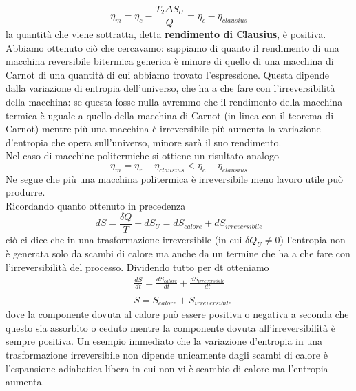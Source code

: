 \documentclass[
10pt, %
a4paper, %
oneside, %
headinclude,footinclude, %
BCOR5mm, %
]{scrartcl}
\begin{document}
\[ \eta_m = \eta_c-\frac{T_2\Delta S_U}{Q} = \eta_c - \eta_{clausius} \]
la quantità che viene sottratta, detta \textbf{rendimento di Clausius}, è positiva. Abbiamo ottenuto ciò che cercavamo: sappiamo di quanto il rendimento di una macchina reversibile bitermica generica è minore di quello di una macchina di Carnot di una quantità di cui abbiamo trovato l'espressione. Questa dipende dalla variazione di entropia dell'universo, che ha a che fare con l'irreversibilità della macchina: se questa fosse nulla avremmo che il rendimento della macchina termica è uguale a quello della macchina di Carnot (in linea con il teorema di Carnot) mentre più una macchina è irreversibile più aumenta la variazione d'entropia che opera sull'universo, minore sarà il suo rendimento.\\
Nel caso di macchine politermiche si ottiene un risultato analogo 
\[\eta_m = \eta_r - \eta_{clausius} < \eta_c -\eta_{clausius}\]
Ne segue che più una macchina politermica è irreversibile meno lavoro utile può produrre.\\
Ricordando quanto ottenuto in precedenza
\[dS = \frac{\delta Q}{T}+dS_U=dS_{calore} +dS_{irreversibile}\]
ciò ci dice che in una trasformazione irreversibile (in cui $\delta Q_U \neq 0$) l'entropia non è generata solo da scambi di calore ma anche da un termine che ha a che fare con l'irreversibilità del processo. Dividendo tutto per dt otteniamo
\begin{align*}
	&\frac{dS}{dt}=\frac{dS_{calore}}{dt}+\frac{dS_{irreversibile}}{dt}\\
	&\dot{S} = \dot{S}_{calore} + \dot{S}_{irreversibile}
\end{align*}
dove la componente dovuta al calore può essere positiva o negativa a seconda che questo sia assorbito o ceduto mentre la componente dovuta all'irreversibilità è sempre positiva. Un esempio immediato che la variazione d'entropia in una trasformazione irreversibile non dipende unicamente dagli scambi di calore è l'espansione adiabatica libera in cui non vi è scambio di calore ma l'entropia aumenta.\\\\
\end{document}
